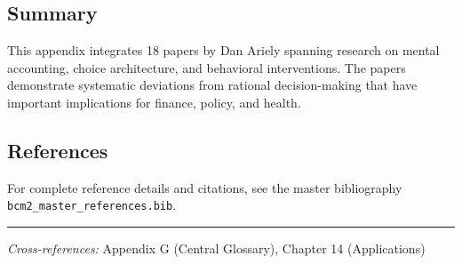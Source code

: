 \subsection{Summary}

This appendix integrates 18 papers by Dan Ariely
spanning research on mental accounting, choice architecture, and behavioral
interventions. The papers demonstrate systematic deviations from rational
decision-making that have important implications for finance, policy, and health.

\subsection{References}

For complete reference details and citations, see the master bibliography
\texttt{bcm2\_master\_references.bib}.

\vspace{1em}
\hrule
\vspace{0.5em}

\noindent\textit{Cross-references:}
Appendix G (Central Glossary), Chapter 14 (Applications)
